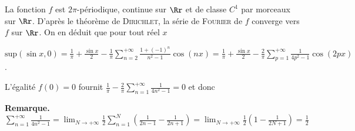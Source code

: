 {{La fonction $f$ est $2\pi$-périodique, continue sur $\Rr$ et de classe $C^1$ par morceaux sur $\Rr$. D'après le théorème de \textsc{Dirichlet}, la série de \textsc{Fourier} de $f$ converge vers $f$ sur $\Rr$. On en déduit que pour tout réel $x$

\begin{center}
$\text{sup}(\sin x,0)=\frac{1}{\pi}+\frac{\sin x}{2}-\frac{1}{\pi}\sum_{n=2}^{+\infty}\frac{1+(-1)^n}{n^2-1}\cos(nx)=\frac{1}{\pi}+\frac{\sin x}{2}-\frac{2}{\pi}\sum_{p=1}^{+\infty}\frac{1}{4p^2-1}\cos(2px)$.
\end{center}

\begin{center}
\end{center}

L'égalité $f(0)=0$ fournit $\frac{1}{\pi}-\frac{2}{\pi}\sum_{n=1}^{+\infty}\frac{1}{4n^2-1}=0$ et donc

\begin{center}
\end{center}

\textbf{Remarque.} $\sum_{n=1}^{+\infty}\frac{1}{4n^2-1}=\lim_{N \rightarrow +\infty}\frac{1}{2}\sum_{n=1}^{N}\left(\frac{1}{2n-1}-\frac{1}{2n+1}\right)=\lim_{N \rightarrow +\infty}\frac{1}{2}\left(1-\frac{1}{2N+1}\right)=\frac{1}{2}$
}
}
